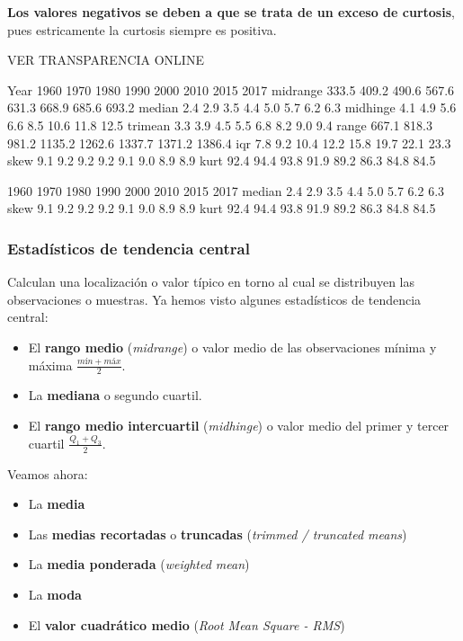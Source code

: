 \documentclass[11pt]{article}
\providecommand{\tightlist}{%
      \setlength{\itemsep}{0pt}\setlength{\parskip}{0pt}}
\begin{document}
\textbf{Los valores negativos se deben a que se trata de un exceso de
curtosis}, pues estricamente la curtosis siempre es positiva.

VER TRANSPARENCIA ONLINE

Year      1960  1970  1980   1990   2000   2010   2015   2017
midrange 333.5 409.2 490.6  567.6  631.3  668.9  685.6  693.2
median     2.4   2.9   3.5    4.4    5.0    5.7    6.2    6.3
midhinge   4.1   4.9   5.6    6.6    8.5   10.6   11.8   12.5
trimean    3.3   3.9   4.5    5.5    6.8    8.2    9.0    9.4
range    667.1 818.3 981.2 1135.2 1262.6 1337.7 1371.2 1386.4
iqr        7.8   9.2  10.4   12.2   15.8   19.7   22.1   23.3
skew       9.1   9.2   9.2    9.2    9.1    9.0    8.9    8.9
kurt      92.4  94.4  93.8   91.9   89.2   86.3   84.8   84.5
            
        1960  1970  1980  1990  2000  2010  2015  2017
median   2.4   2.9   3.5   4.4   5.0   5.7   6.2   6.3
skew     9.1   9.2   9.2   9.2   9.1   9.0   8.9   8.9
kurt    92.4  94.4  93.8  91.9  89.2  86.3  84.8  84.5
            
    \subsubsection*{Estadísticos de tendencia
central}\label{estaduxedsticos-de-tendencia-central}

Calculan una localización o valor típico en torno al cual se distribuyen
las observaciones o muestras. Ya hemos visto algunes estadísticos de
tendencia central:

\begin{itemize}
\tightlist
\item
  El \textbf{rango medio} (\emph{midrange}) o valor medio de las
  observaciones mínima y máxima \(\frac{mín + máx}{2}\).
\item
  La \textbf{mediana} o segundo cuartil.
\item
  El \textbf{rango medio intercuartil} (\emph{midhinge}) o valor medio
  del primer y tercer cuartil \(\frac{Q_1+Q_3}{2}\).
\end{itemize}

    Veamos ahora:

\begin{itemize}
\tightlist
\item
  La \textbf{media}
\item
  Las \textbf{medias recortadas} o \textbf{truncadas} (\emph{trimmed /
  truncated means})
\item
  La \textbf{media ponderada} (\emph{weighted mean})
\item
  La \textbf{moda}
\item
  El \textbf{valor cuadrático medio} (\emph{Root Mean Square - RMS})
\end{itemize}
\end{document}
